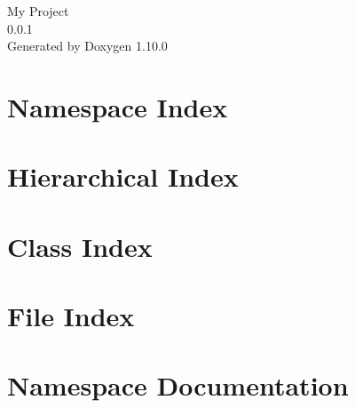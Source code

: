 \documentclass[twoside]{book}
\newcommand{\+}{\discretionary{\mbox{\scriptsize$\hookleftarrow$}}{}{}}
\newcommand{\clearemptydoublepage}{%
    \newpage{\pagestyle{empty}\cleardoublepage}%
  }
\begin{document}
  \raggedbottom
    \hypersetup{pageanchor=false,
                bookmarksnumbered=true,
                pdfencoding=unicode
               }
  \begin{titlepage}
  \vspace*{7cm}
  \begin{center}%
  {\Large My Project}\\
  [1ex]\large 0.\+0.\+1 \\
  \vspace*{1cm}
  {\large Generated by Doxygen 1.10.0}\\
  \end{center}
  \end{titlepage}
  \clearemptydoublepage
  \tableofcontents
  \clearemptydoublepage
  \hypersetup{pageanchor=true}




\chapter{Namespace Index}

\chapter{Hierarchical Index}

\chapter{Class Index}

\chapter{File Index}

\chapter{Namespace Documentation}
















\end{document}
